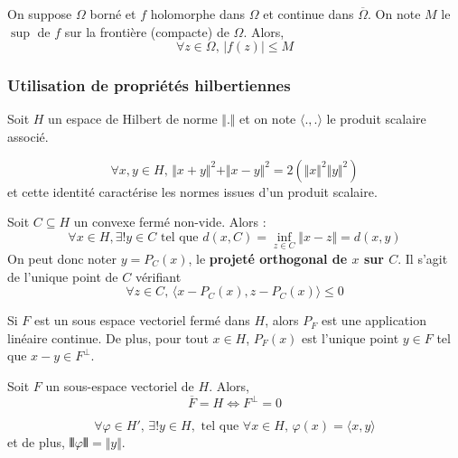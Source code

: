 	\begin{theorem}
		On suppose $\Omega$ borné et $f$ holomorphe dans $\Omega$ et continue dans $\overline{\Omega}$. On note $M$ le $\sup$ de $f$ sur la frontière (compacte) de $\Omega$. Alors,
		\[ \forall z \in \Omega, \, \vert f(z) \vert \leq M \]
	\end{theorem}

	\subsubsection{Utilisation de propriétés hilbertiennes}


	Soit $H$ un espace de Hilbert de norme $\Vert . \Vert$ et on note $\langle ., . \rangle$ le produit scalaire associé.

	\begin{lemma}
		\[ \forall x, y \in H, \, \Vert x + y \Vert^2 + \Vert x - y \Vert^2 = 2(\Vert x \Vert^2 \Vert y \Vert^2) \]
		et cette identité caractérise les normes issues d'un produit scalaire.
	\end{lemma}


	\begin{theorem}
		Soit $C \subseteq H$ un convexe fermé non-vide. Alors :
		\[ \forall x \in H, \exists! y \in C \text{ tel que } d(x, C) = \inf_{z \in C} \Vert x - z \Vert = d(x, y) \]
		On peut donc noter $y = P_C(x)$, le \textbf{projeté orthogonal de $x$ sur $C$}. Il s'agit de l'unique point de $C$ vérifiant
		\[ \forall z \in C, \, \langle x - P_C(x), z - P_C(x) \rangle \leq 0 \]
	\end{theorem}

	\begin{theorem}
		Si $F$ est un sous espace vectoriel fermé dans $H$, alors $P_F$ est une application linéaire continue. De plus, pour tout $x \in H$, $P_F(x)$ est l'unique point $y \in F$ tel que $x-y \in F^\perp$.
	\end{theorem}

	\begin{application}
		Soit $F$ un sous-espace vectoriel de $H$. Alors,
		\[ \overline{F} = H \iff F^\perp = 0 \]
	\end{application}

	\begin{application}
		\[ \forall \varphi \in H', \, \exists! y \in H, \text{ tel que } \forall x \in H, \, \varphi(x) = \langle x, y \rangle \]
		et de plus, $\VERT \varphi \VERT = \Vert y \Vert$.
	\end{application}

